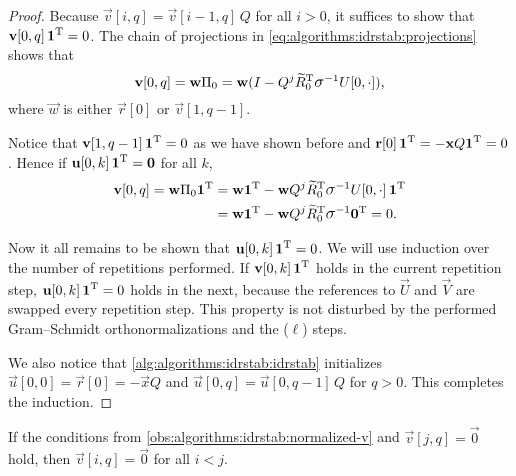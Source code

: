 \begin{proof}
  Because $\vec{v}[i, q] = \vec{v}[i - 1, q] \, Q$ for all $i > 0$, it
  suffices to show that $\bm{\mathrm{v}}[0, q] \, \bm{\mathrm{1}}^{\mathrm{T}} = 0$. The chain
  of projections in \vref{eq:algorithms:idrstab:projections} shows
  that
  \begin{equation}
    \vec{v}[0, q] = \vec{w} \Pi_0 = \vec{w} ( I - Q^{j}
    \widetilde{R}_0^\T \largesigma^{-1} U[0, \cdot] ) \text,
  \end{equation} where $\vec{w}$ is either $\vec{r}[0]$ or
  $\vec{v}[1, q - 1]$.

  Notice that $\bm{\mathrm{v}}[1, q - 1] \, \bm{\mathrm{1}}^{\mathrm{T}} = 0$ as we have shown
  before and $\bm{\mathrm{r}}[0] \, \bm{\mathrm{1}}^{\mathrm{T}} = -\bm{\mathrm{x}} Q \bm{\mathrm{1}}^{\mathrm{T}} =
  0$. Hence if $\bm{\mathrm{u}}[0, k] \, \bm{\mathrm{1}}^{\mathrm{T}} = \bm{\mathrm{0}}$ for all $k$,
  \begin{align}
    \vec{v}[0, q] = \vec{w} \Pi_0 \vec{1}^\T &= \vec{w} \vec{1}^\T - \vec{w} Q^{j}
    \widetilde{R}_0^\T \largesigma^{-1} U[0, \cdot] \, \vec{1}^\T \\
    & =\vec{w} \vec{1}^\T - \vec{w} Q^{j}
    \widetilde{R}_0^\T \largesigma^{-1} \vec{0}^\T = 0 \text.
  \end{align}

  Now it all remains to be shown that
  $\bm{\mathrm{u}}[0, k] \, \bm{\mathrm{1}}^{\mathrm{T}} = 0$. We will use induction over the
  number of repetitions performed. If $\bm{\mathrm{v}}[0, k] \, \bm{\mathrm{1}}^{\mathrm{T}}$
  holds in the current repetition step,
  $\bm{\mathrm{u}}[0, k] \, \bm{\mathrm{1}}^{\mathrm{T}} = 0$ holds in the next, because the
  references to $\vec{U}$ and $\vec{V}$ are swapped every repetition
  step. This property is not disturbed by the performed Gram--Schmidt
  orthonormalizations and the ($\ell$) steps.

  We also notice that \vref{alg:algorithms:idrstab:idrstab}
  initializes $\vec{u}[0, 0] = \vec{r}[0] = -\vec{x} Q$ and
  $\vec{u}[0, q] = \vec{u}[0, q - 1] \, Q$ for $q > 0$. This completes
  the induction.
\end{proof}

\begin{obs}
  \label{obs:algorithms:idrstab:vanishing-v}
  If the conditions from \cref{obs:algorithms:idrstab:normalized-v}
  and $\vec{v}[j, q] = \vec{0}$ hold, then $\vec{v}[i, q] = \vec{0}$
  for all $i < j$.
\end{obs}

